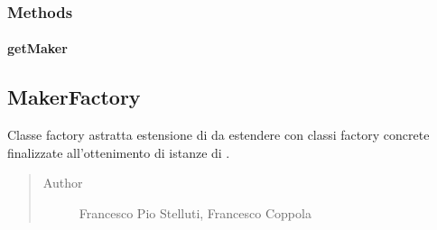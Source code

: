 \documentclass[letterpaper,10pt,italian]{sphinxmanual}
\begin{document}
\subsubsection{Methods}
\label{\detokenize{source/it/unicam/cs/pa/mastermind/factories/InteractiveMakerFactory:methods}}

\paragraph{getMaker}
\label{\detokenize{source/it/unicam/cs/pa/mastermind/factories/InteractiveMakerFactory:getmaker}}

\begin{fulllineitems}
\label{\detokenize{source/it/unicam/cs/pa/mastermind/factories/InteractiveMakerFactory:it.unicam.cs.pa.mastermind.factories.InteractiveMakerFactory.getMaker()}}
\end{fulllineitems}



\subsection{MakerFactory}
\label{\detokenize{source/it/unicam/cs/pa/mastermind/factories/MakerFactory:makerfactory}}\label{\detokenize{source/it/unicam/cs/pa/mastermind/factories/MakerFactory::doc}}

\begin{fulllineitems}
\label{\detokenize{source/it/unicam/cs/pa/mastermind/factories/MakerFactory:it.unicam.cs.pa.mastermind.factories.MakerFactory}}
Classe factory astratta estensione di  da estendere con classi factory concrete finalizzate all’ottenimento di istanze di .
\begin{quote}\begin{description}
\item[{Author}] \leavevmode
Francesco Pio Stelluti, Francesco Coppola

\end{description}\end{quote}

\end{fulllineitems}
\end{document}
